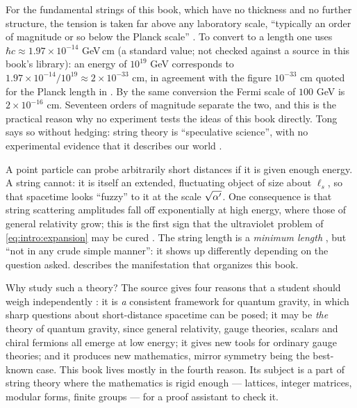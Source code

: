 For the fundamental strings of this book, which have no thickness and no further structure,
the tension is taken far above any laboratory scale, ``typically an order of magnitude or so
below the Planck scale'' . To convert to a length one uses
$\hbar c\approx 1.97\times10^{-14}$ GeV\,cm (a standard value; not checked against a source in
this book's library): an energy of $10^{19}$ GeV corresponds to
$1.97\times 10^{-14}/10^{19}\approx 2\times10^{-33}$ cm, in agreement with the figure
$10^{-33}$ cm quoted for the Planck length in . By the same
conversion the Fermi scale of $100$ GeV is $2\times10^{-16}$ cm. Seventeen orders of magnitude
separate the two, and this is the practical reason why no experiment tests the ideas of this
book directly. Tong says so without hedging: string theory is ``speculative science'', with no
experimental evidence that it describes our world .

\begin{physicsbox}
A point particle can probe arbitrarily short distances if it is given enough energy. A string
cannot: it is itself an extended, fluctuating object of size about $\ell_s$, so that spacetime
looks ``fuzzy'' to it at the scale $\sqrt{\alpha'}$. One consequence is that string scattering
amplitudes fall off exponentially at high energy, where those of general relativity grow; this
is the first sign that the ultraviolet problem of \cref{eq:intro:expansion} may be cured
. The string length is a \emph{minimum length}%
, but ``not in any crude simple manner'': it shows up differently
depending on the question asked.  describes the manifestation that
organizes this book.
\end{physicsbox}

Why study such a theory? The source gives four reasons that a student should weigh
independently : it is \emph{a} consistent framework for quantum
gravity, in which sharp questions about short-distance spacetime can be posed; it may be
\emph{the} theory of quantum gravity, since general relativity, gauge theories, scalars and
chiral fermions all emerge at low energy; it gives new tools for ordinary gauge theories; and
it produces new mathematics, mirror symmetry being the best-known case. This book lives
mostly in the fourth reason. Its subject is a part of string theory where the mathematics is
rigid enough --- lattices, integer matrices, modular forms, finite groups --- for a proof
assistant to check it.

